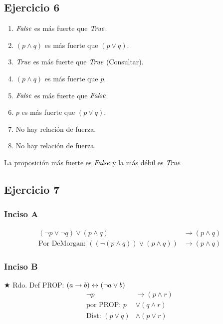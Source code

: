 \subsection{Ejercicio 6}
\begin{enumerate}[label=(\alph*)]
    \item $\emph{False}$ es más fuerte que $\emph{True}$.
    \item $(p \wedge q)$ es más fuerte que $(p \vee q)$.
    \item $\emph{True}$ es más fuerte que $\emph{True}$ (Consultar).
    \item $(p \wedge q)$ es más fuerte que $p$.
    \item $\emph{False}$ es más fuerte que $\emph{False}$.
    \item $p$ es más fuerte que $(p\vee q)$.
    \item No hay relación de fuerza.
    \item No hay relación de fuerza.
\end{enumerate}

La proposición más fuerte es $\emph{False}$ y la más débil es $\emph{True}$

\subsection{Ejercicio 7}
\subsubsection{Inciso A}

\begin{align*}
    (\neg p \vee \neg q) \vee (p \wedge q) &\rightarrow (p \wedge q) \\
    \text{Por DeMorgan: } ((\neg(p \wedge q)) \vee (p \wedge q)) &\rightarrow (p \wedge q)
\end{align*}

\subsubsection{Inciso B}

$\bigstar$ Rdo. Def PROP: $(a \rightarrow b) \leftrightarrow (\neg a \vee b)$ 
\begin{align*}
    \neg p &\rightarrow (p \wedge r) \\
    \text{por PROP: } p &\vee (q \wedge r)\\
    \text{Dist: } (p\vee q) &\wedge (p\vee r)
\end{align*}

